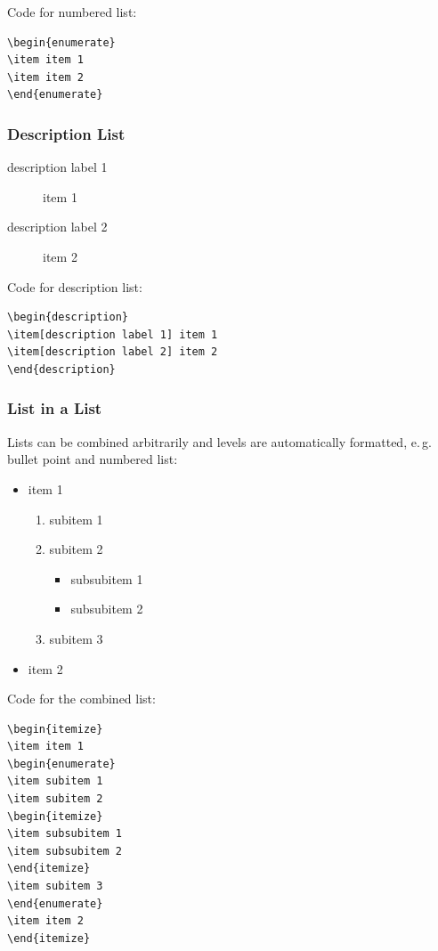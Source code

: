 \documentclass{pharmrep}
\newcommand{\eg}{e.\,g.\xspace}
\begin{document}
Code for numbered list:
\begin{verbatim}
\begin{enumerate}
\item item 1
\item item 2
\end{enumerate}
\end{verbatim}

\subsubsection{Description List}
\begin{description}
\item[description label 1] item 1
\item[description label 2] item 2
\end{description}

Code for description list:
\begin{verbatim}
\begin{description}
\item[description label 1] item 1
\item[description label 2] item 2
\end{description}
\end{verbatim}

\subsubsection{List in a List}
Lists can be combined arbitrarily and levels are automatically formatted, \eg bullet point and numbered
list:
\begin{itemize}
\item item 1
\begin{enumerate}
\item subitem 1
\item subitem 2
\begin{itemize}
\item subsubitem 1
\item subsubitem 2
\end{itemize}
\item subitem 3
\end{enumerate}
\item item 2
\end{itemize}

Code for the combined list:
\begin{verbatim}
\begin{itemize}
\item item 1
\begin{enumerate}
\item subitem 1
\item subitem 2
\begin{itemize}
\item subsubitem 1
\item subsubitem 2
\end{itemize}
\item subitem 3
\end{enumerate}
\item item 2
\end{itemize}
\end{verbatim}
\end{document}

